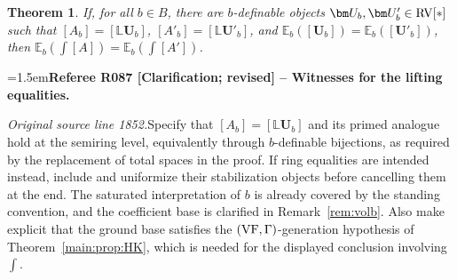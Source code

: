 \documentclass[12pt]{amsart}
\newcommand{\RefereeRemark}[4]{%
  \par\medskip\begingroup\normalfont\small\color{RefereePurple}%
  \emergencystretch=1.5em\noindent\textbf{Referee R#1 [#2] -- #3.}\par\nobreak\noindent #4\par
  \endgroup\medskip
}
\theoremstyle{plain}
\newtheorem{thm}{Theorem}[section]
\theoremstyle{definition}
\theoremstyle{remark}
\numberwithin{equation}{section}
\theoremstyle{plain}
\newcommand{\VF}{\textup{VF}}
\newcommand{\RV}{\textup{RV}}
\newcommand{\0}{\emptyset}
\newcommand{\bb}[1]{\mathbb{#1}}
\begin{document}
\begin{thm}\label{fubini}
If, for all $b \in B$, there are $b$-definable objects $\bm U_{b}, \bm U'_{b} \in \RV[*]$ such that $[A_b] = [\bb L \bm U_{b}]$, $[A'_b] = [\bb L \bm U'_{b}]$, and $\bb E_b ([\bm U_b]) = \bb E_b (  [\bm U'_b])$, then $\bb E_b (\int [A]) = \bb E_b ( \int [A'])$.
\end{thm}

\RefereeRemark{087}{Clarification; revised}{Witnesses for the lifting equalities}{%
\textit{Original source line 1852.}\quad Specify that $[A_b]=[\mathbb L\bm U_b]$ and its primed analogue hold at the semiring level, equivalently through $b$-definable bijections, as required by the replacement of total spaces in the proof. If ring equalities are intended instead, include and uniformize their stabilization objects before cancelling them at the end. The saturated interpretation of $b$ is already covered by the standing convention, and the coefficient base is clarified in Remark~\ref{rem:volb}. Also make explicit that the ground base satisfies the $(\VF,\Gamma)$-generation hypothesis of Theorem~\ref{main:prop:HK}, which is needed for the displayed conclusion involving $\int$.
}
\end{document}
